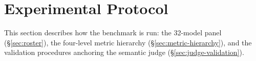 \documentclass{article}
\begin{document}
%
\section{Experimental Protocol}

This section describes how the benchmark is run: the 32-model panel (\S\ref{sec:roster}), the four-level metric hierarchy (\S\ref{sec:metric-hierarchy}), and the validation procedures anchoring the semantic judge (\S\ref{sec:judge-validation}).
\end{document}
